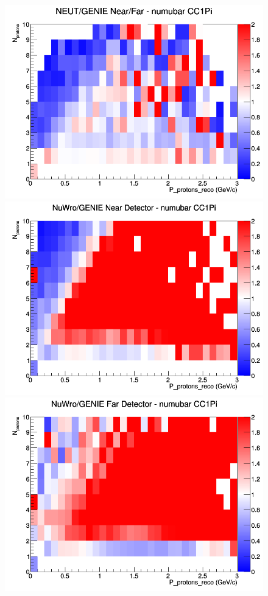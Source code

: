 \documentclass[12pt]{article}
\begin{document}
\begin{figure}[h]
\endminipage
{}
\includegraphics[width=\linewidth]{eff_N_P/GAr/protons/ratios/CC1Pi_NEUT_GENIE_numubar_NF_N_P.png}
\endminipage
\newline
{}
\includegraphics[width=\linewidth]{eff_N_P/GAr/protons/ratios/CC1Pi_NuWro_GENIE_numubar_near_N_P.png}
\endminipage
{}
\includegraphics[width=\linewidth]{eff_N_P/GAr/protons/ratios/CC1Pi_NuWro_GENIE_numubar_far_N_P.png}

\end{figure}
\end{document}
